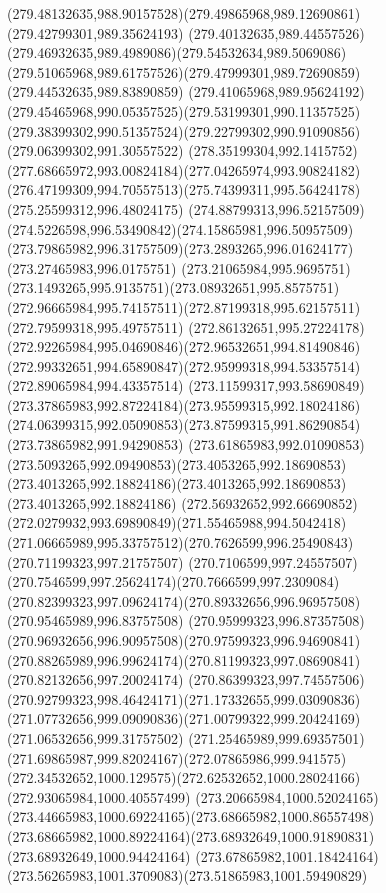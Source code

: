 {{\curveto(279.48132635,988.90157528)(279.49865968,989.12690861)(279.42799301,989.35624193)
\curveto(279.40132635,989.44557526)(279.46932635,989.4989086)(279.54532634,989.5069086)
\curveto(279.51065968,989.61757526)(279.47999301,989.72690859)(279.44532635,989.83890859)
\curveto(279.41065968,989.95624192)(279.45465968,990.05357525)(279.53199301,990.11357525)
\curveto(279.38399302,990.51357524)(279.22799302,990.91090856)(279.06399302,991.30557522)
\curveto(278.35199304,992.1415752)(277.68665972,993.00824184)(277.04265974,993.90824182)
\curveto(276.47199309,994.70557513)(275.74399311,995.56424178)(275.25599312,996.48024175)
\curveto(274.88799313,996.52157509)(274.5226598,996.53490842)(274.15865981,996.50957509)
\curveto(273.79865982,996.31757509)(273.2893265,996.01624177)(273.27465983,996.0175751)
\curveto(273.21065984,995.9695751)(273.1493265,995.9135751)(273.08932651,995.8575751)
\curveto(272.96665984,995.74157511)(272.87199318,995.62157511)(272.79599318,995.49757511)
\curveto(272.86132651,995.27224178)(272.92265984,995.04690846)(272.96532651,994.81490846)
\curveto(272.99332651,994.65890847)(272.95999318,994.53357514)(272.89065984,994.43357514)
\curveto(273.11599317,993.58690849)(273.37865983,992.87224184)(273.95599315,992.18024186)
\curveto(274.06399315,992.05090853)(273.87599315,991.86290854)(273.73865982,991.94290853)
\curveto(273.61865983,992.01090853)(273.5093265,992.09490853)(273.4053265,992.18690853)
\curveto(273.4013265,992.18824186)(273.4013265,992.18690853)(273.4013265,992.18824186)
\curveto(272.56932652,992.66690852)(272.0279932,993.69890849)(271.55465988,994.5042418)
\curveto(271.06665989,995.33757512)(270.7626599,996.25490843)(270.71199323,997.21757507)
\curveto(270.7106599,997.24557507)(270.7546599,997.25624174)(270.7666599,997.2309084)
\curveto(270.82399323,997.09624174)(270.89332656,996.96957508)(270.95465989,996.83757508)
\curveto(270.95999323,996.87357508)(270.96932656,996.90957508)(270.97599323,996.94690841)
\curveto(270.88265989,996.99624174)(270.81199323,997.08690841)(270.82132656,997.20024174)
\curveto(270.86399323,997.74557506)(270.92799323,998.46424171)(271.17332655,999.03090836)
\curveto(271.07732656,999.09090836)(271.00799322,999.20424169)(271.06532656,999.31757502)
\curveto(271.25465989,999.69357501)(271.69865987,999.82024167)(272.07865986,999.941575)
\curveto(272.34532652,1000.129575)(272.62532652,1000.28024166)(272.93065984,1000.40557499)
\curveto(273.20665984,1000.52024165)(273.44665983,1000.69224165)(273.68665982,1000.86557498)
\curveto(273.68665982,1000.89224164)(273.68932649,1000.91890831)(273.68932649,1000.94424164)
\curveto(273.67865982,1001.18424164)(273.56265983,1001.3709083)(273.51865983,1001.59490829)
}}
